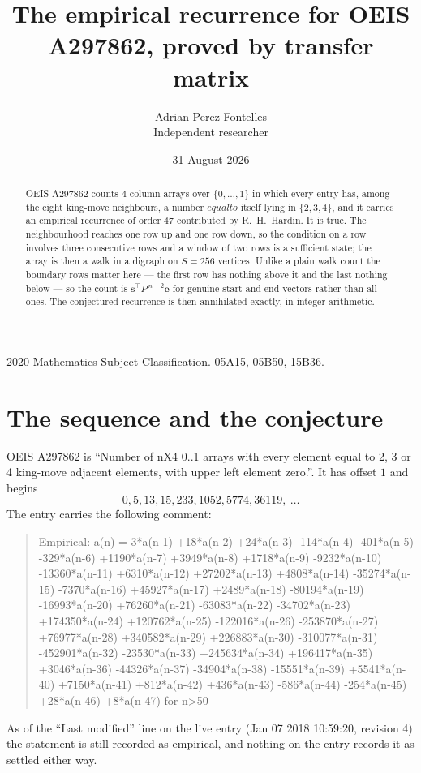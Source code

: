 \documentclass[11pt,a4paper]{article}
\title{The empirical recurrence for OEIS A297862, proved by transfer matrix}
\author{Adrian Perez Fontelles\\ \small Independent researcher}
\date{31 August 2026}
\theoremstyle{plain}
\theoremstyle{definition}
\begin{document}
\maketitle

\begin{abstract}
OEIS A297862 counts $4$-column arrays over $\{0,\dots,1\}$ in which every entry has,
among the eight king-move neighbours, a number $equal to$ itself lying in $\{2,3,4\}$, and it carries an empirical
recurrence of order $47$ contributed by R.~H.~Hardin. It is true. The neighbourhood
reaches one row up and one row down, so the condition on a row involves three consecutive
rows and a window of two rows is a sufficient state; the array is then a walk in a digraph
on $S=256$ vertices. Unlike a plain walk count the boundary rows matter here --- the first
row has nothing above it and the last nothing below --- so the count is
$\mathbf{s}^{\!\top}P^{\,n-2}\mathbf{e}$ for genuine start and end vectors rather than
all-ones. The conjectured recurrence is then annihilated exactly, in integer arithmetic.
\end{abstract}

\noindent\small 2020 Mathematics Subject Classification. 05A15, 05B50, 15B36.\normalsize

\section{The sequence and the conjecture}

OEIS A297862 is ``Number of nX4 0..1 arrays with every element equal to 2, 3 or 4 king-move adjacent elements, with upper left element zero.''. It has offset
$1$ and begins
\[
0, 5, 13, 15, 233, 1052, 5774, 36119,\ \dots
\]
The entry carries the following comment:
\begin{quote}\small
Empirical: a(n) = 3*a(n-1) +18*a(n-2) +24*a(n-3) -114*a(n-4) -401*a(n-5) -329*a(n-6) +1190*a(n-7) +3949*a(n-8) +1718*a(n-9) -9232*a(n-10) -13360*a(n-11) +6310*a(n-12) +27202*a(n-13) +4808*a(n-14) -35274*a(n-15) -7370*a(n-16) +45927*a(n-17) +2489*a(n-18) -80194*a(n-19) -16993*a(n-20) +76260*a(n-21) -63083*a(n-22) -34702*a(n-23) +174350*a(n-24) +120762*a(n-25) -122016*a(n-26) -253870*a(n-27) +76977*a(n-28) +340582*a(n-29) +226883*a(n-30) -310077*a(n-31) -452901*a(n-32) -23530*a(n-33) +245634*a(n-34) +196417*a(n-35) +3046*a(n-36) -44326*a(n-37) -34904*a(n-38) -15551*a(n-39) +5541*a(n-40) +7150*a(n-41) +812*a(n-42) +436*a(n-43) -586*a(n-44) -254*a(n-45) +28*a(n-46) +8*a(n-47) for n>50
\end{quote}
As of the ``Last modified'' line on the live entry (Jan 07 2018 10:59:20, revision
4) the statement is still recorded as empirical, and nothing on the entry
records it as settled either way.
\end{document}
